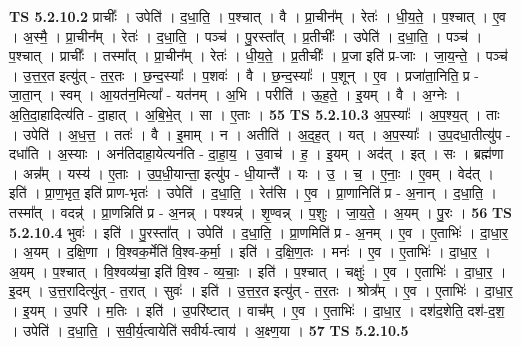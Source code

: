 \documentclass[17pt]{extarticle}
\begin{document}
                                \textbf{ TS 5.2.10.2} \newline
                  प्राचीः᳚ । उपेति॑ । द॒धा॒ति॒ । प॒श्चात् । वै । प्रा॒चीन᳚म् । रेतः॑ । धी॒य॒ते॒ । प॒श्चात् । ए॒व । अ॒स्मै॒ । प्रा॒चीन᳚म् । रेतः॑ । द॒धा॒ति॒ । पञ्च॑ । पु॒रस्ता᳚त् । प्र॒तीचीः᳚ । उपेति॑ । द॒धा॒ति॒ । पञ्च॑ । प॒श्चात् । प्राचीः᳚ । तस्मा᳚त् । प्रा॒चीन᳚म् । रेतः॑ । धी॒य॒ते॒ । प्र॒तीचीः᳚ । प्र॒जा इति॑ प्र-जाः । जा॒य॒न्ते॒ । पञ्च॑ । उ॒त्त॒र॒त इत्यु॑त् - त॒र॒तः । छ॒न्द॒स्याः᳚ । प॒शवः॑ । वै । छ॒न्द॒स्याः᳚ । प॒शून् । ए॒व । प्रजा॑ता॒निति॒ प्र - जा॒ता॒न् । स्वम् । आ॒यत॑न॒मित्या᳚ - यत॑नम् । अ॒भि । परीति॑ । ऊ॒ह॒ते॒ । इ॒यम् । वै । अ॒ग्नेः । अ॒ति॒दा॒हादित्य॑ति - दा॒हात् । अ॒बि॒भे॒त् । सा । ए॒ताः । \textbf{  55} \newline
                  \newline
                                \textbf{ TS 5.2.10.3} \newline
                  अ॒प॒स्याः᳚ । अ॒प॒श्य॒त् । ताः । उपेति॑ । अ॒ध॒त्त॒ । ततः॑ । वै । इ॒माम् । न । अतीति॑ । अ॒द॒ह॒त् । यत् । अ॒प॒स्याः᳚ । उ॒प॒दधा॒तीत्यु॑प - दधा॑ति । अ॒स्याः । अन॑तिदाहा॒येत्यन॑ति - दा॒हा॒य॒ । उ॒वाच॑ । ह॒ । इ॒यम् । अद॑त् । इत् । सः । ब्रह्म॑णा । अन्न᳚म् । यस्य॑ । ए॒ताः । उ॒प॒धी॒यान्ता॒ इत्यु॑प - धी॒यान्तै᳚ । यः । उ॒ । च॒ । ए॒नाः॒ । ए॒वम् । वेद॑त् । इति॑ । प्रा॒ण॒भृत॒ इति॑ प्राण-भृतः॑ । उपेति॑ । द॒धा॒ति॒ । रेत॑सि । ए॒व । प्रा॒णानिति॑ प्र - अ॒नान् । द॒धा॒ति॒ । तस्मा᳚त् । वदन्न्॑ । प्रा॒णन्निति॑ प्र - अ॒नन्न् । पश्यन्न्॑ । शृ॒ण्वन्न् । प॒शुः । जा॒य॒ते॒ । अ॒यम् । पु॒रः । \textbf{  56} \newline
                  \newline
                                \textbf{ TS 5.2.10.4} \newline
                  भुवः॑ । इति॑ । पु॒रस्ता᳚त् । उपेति॑ । द॒धा॒ति॒ । प्रा॒णमिति॑ प्र - अ॒नम् । ए॒व । ए॒ताभिः॑ । दा॒धा॒र॒ । अ॒यम् । द॒क्षि॒णा । वि॒श्वक॒र्मेति॑ वि॒श्व-क॒र्मा॒ । इति॑ । द॒क्षि॒ण॒तः । मनः॑ । ए॒व । ए॒ताभिः॑ । दा॒धा॒र॒ । अ॒यम् । प॒श्चात् । वि॒श्वव्य॑चा॒ इति॑ वि॒श्व - व्य॒चाः॒ । इति॑ । प॒श्चात् । चक्षुः॑ । ए॒व । ए॒ताभिः॑ । दा॒धा॒र॒ । इ॒दम् । उ॒त्त॒रादित्यु॑त् - त॒रात् । सुवः॑ । इति॑ । उ॒त्त॒र॒त इत्यु॑त् - त॒र॒तः । श्रोत्र᳚म् । ए॒व । ए॒ताभिः॑ । दा॒धा॒र॒ । इ॒यम् । उ॒परि॑ । म॒तिः । इति॑ । उ॒परि॑ष्टात् । वाच᳚म् । ए॒व । ए॒ताभिः॑ । दा॒धा॒र॒ । दश॑द॒शेति॒ दश॑-द॒श॒ । उपेति॑ । द॒धा॒ति॒ । स॒वी॒र्य॒त्वायेति॑ सवीर्य-त्वाय॑ । अ॒क्ष्ण॒या । \textbf{  57} \newline
                  \newline
                                \textbf{ TS 5.2.10.5} \newline
\end{document}
